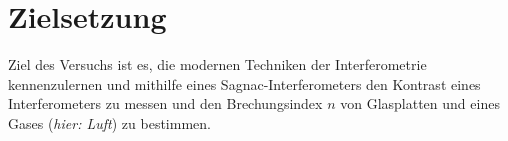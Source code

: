 \chapter{Zielsetzung}
\label{cha:zielsetzung}

Ziel des Versuchs ist es, die modernen Techniken der Interferometrie kennenzulernen und mithilfe eines
Sagnac-Interferometers den Kontrast eines Interferometers zu messen und den Brechungsindex $n$ von Glasplatten 
und eines Gases (\textit{hier: Luft}) zu bestimmen.